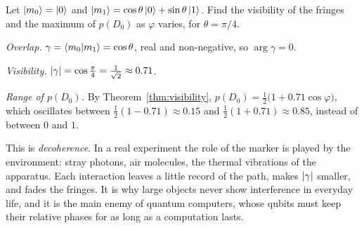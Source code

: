 \begin{example}\label{ex:partial-whichpath}
  Let $\left|m_0\right\rangle=\left|0\right\rangle$ and $\left|m_1\right\rangle=\cos\theta\left|0\right\rangle+\sin\theta\left|1\right\rangle$. Find the visibility of the fringes and the maximum of $p(D_0)$ as $\varphi$ varies, for $\theta=\pi/4$.
\end{example}
\begin{solution}
  \begin{steps}
    \item \emph{Overlap.} $\gamma=\left\langle m_0\middle|m_1\right\rangle=\cos\theta$, real and non-negative, so $\arg\gamma=0$.
    \item \emph{Visibility.} $\left|\gamma\right|=\cos\tfrac\pi4=\tfrac1{\sqrt2}\approx0.71$.
    \item \emph{Range of $p(D_0)$.} By Theorem~\ref{thm:visibility}, $p(D_0)=\tfrac12\bigl(1+0.71\cos\varphi\bigr)$, which oscillates between $\tfrac12(1-0.71)\approx0.15$ and $\tfrac12(1+0.71)\approx0.85$, instead of between $0$ and $1$.
  \end{steps}
\end{solution}

\begin{lookahead}
  This is \emph{decoherence}. In a real experiment the role of the marker is played by the environment: stray photons, air molecules, the thermal vibrations of the apparatus. Each interaction leaves a little record of the path, makes $\left|\gamma\right|$ smaller, and fades the fringes. It is why large objects never show interference in everyday life, and it is the main enemy of quantum computers, whose qubits must keep their relative phases for as long as a computation lasts.
\end{lookahead}

